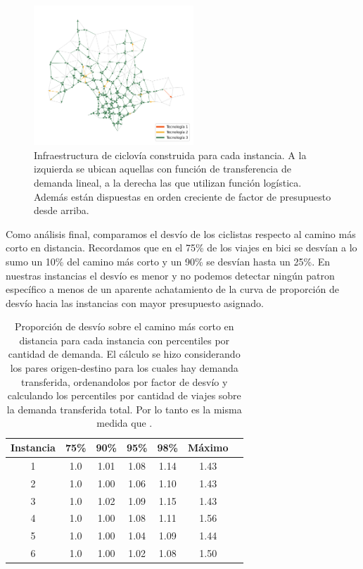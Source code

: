 \documentclass{article}
\begin{document}
\begin{figure}[h!]
    \includegraphics[width=6cm]{../resources/montevideo_d5000.0_inv_logit_1.6_budget_factor.png}
    \caption{Infraestructura de ciclovía construida para cada instancia. A la izquierda se ubican aquellas con función de transferencia de demanda lineal, a la derecha las que utilizan función logística. Además están dispuestas en orden creciente de factor de presupuesto desde arriba.}
    \label{fig:montevideo_instances_infras}
  \end{figure}

  Como análisis final, comparamos el desvío de los ciclistas respecto al camino más corto en distancia. Recordamos que en \cite{winters2010} el 75\% de los viajes en bici se desvían a lo sumo un 10\% del camino más corto y un 90\% se desvían hasta un 25\%. En nuestras instancias el desvío es menor y no podemos detectar ningún patron específico a menos de un aparente achatamiento de la curva de proporción de desvío hacia las instancias con mayor presupuesto asignado.

  \begin{table}[h!]
    \centering
    \begin{tabular}{ccccccc}
      \toprule
        Instancia & 75\% & 90\% & 95\% & 98\% & Máximo \\
      \midrule
        1 & 1.0 & 1.01 & 1.08 & 1.14 & 1.43 \\
        2 & 1.0 & 1.00 & 1.06 & 1.10 & 1.43 \\
        3 & 1.0 & 1.02 & 1.09 & 1.15 & 1.43 \\
        4 & 1.0 & 1.00 & 1.08 & 1.11 & 1.56 \\
        5 & 1.0 & 1.00 & 1.04 & 1.09 & 1.44 \\
        6 & 1.0 & 1.00 & 1.02 & 1.08 & 1.50 \\
      \bottomrule
    \end{tabular}
    \caption{Proporción de desvío sobre el camino más corto en distancia para cada instancia con percentiles por cantidad de demanda. El cálculo se hizo considerando los pares origen-destino para los cuales hay demanda transferida, ordenandolos por factor de desvío y calculando los percentiles por cantidad de viajes sobre la demanda transferida total. Por lo tanto es la misma medida que \cite{winters2010}.}
    \label{table:montevideoshortestpathdeviation}
  \end{table}
\end{document}
